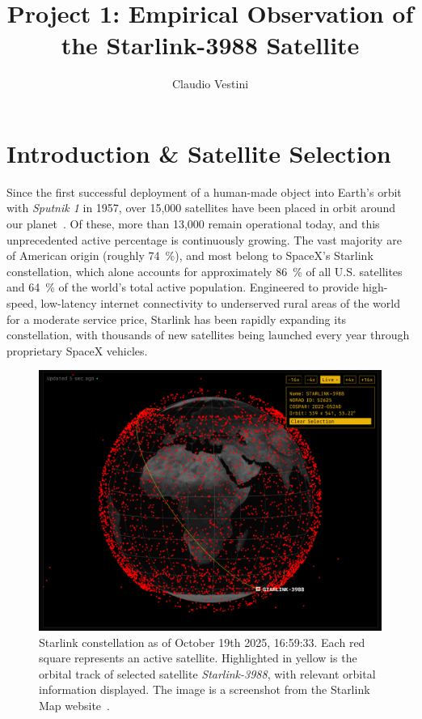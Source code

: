 \documentclass{article}
\title{Project 1: Empirical Observation of the Starlink-3988 Satellite}
\author{Claudio Vestini}
\begin{document}
\maketitle

\section{Introduction \& Satellite Selection}

Since the first successful deployment of a human-made object into Earth's orbit with \textit{Sputnik 1} in 1957, over 15,000 satellites have been placed in orbit around our planet~\cite{lookup-lepoint2025}. Of these, more than 13,000 remain operational today, and this unprecedented active percentage is continuously growing. The vast majority are of American origin (roughly \SI{74}{\percent}), and most belong to SpaceX's Starlink constellation, which alone accounts for approximately \SI{86}{\percent} of all U.S. satellites and \SI{64}{\percent} of the world's total active population. Engineered to provide high-speed, low-latency internet connectivity to underserved rural areas of the world for a moderate service price, Starlink has been rapidly expanding its constellation, with thousands of new satellites being launched every year through proprietary SpaceX vehicles.

\begin{figure}[h!]
    \centering
    \includegraphics[width=\textwidth]{LaTeX/Figures/Starlink Constellation.png}
    \caption{Starlink constellation as of October 19th 2025, 16:59:33. Each red square represents an active satellite. Highlighted in yellow is the orbital track of selected satellite \textit{Starlink-3988}, with relevant orbital information displayed. The image is a screenshot from the Starlink Map website~\cite{starlinkmap.org}.}
    \label{fig:constellation}
\end{figure}
\end{document}

